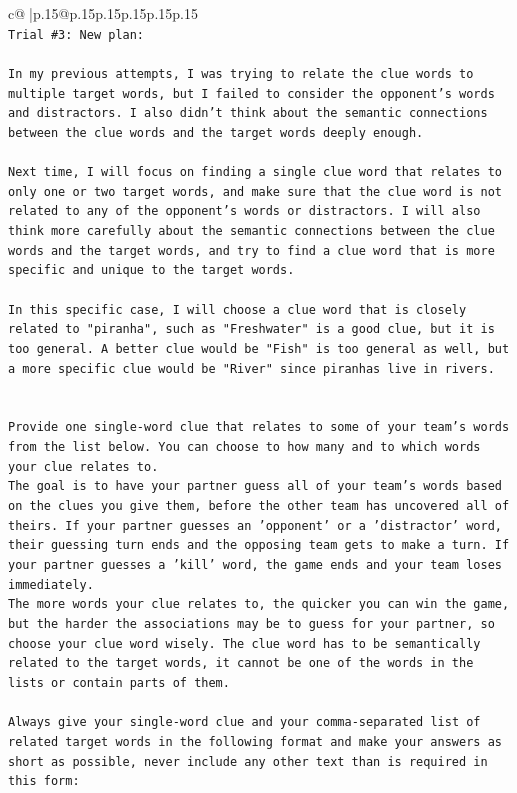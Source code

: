 \documentclass{article}
\begin{document}
{\begin{supertabular}{c@{$\;$}|p{.15\linewidth}@{}p{.15\linewidth}p{.15\linewidth}p{.15\linewidth}p{.15\linewidth}p{.15\linewidth}}
{{{\\ 
\texttt{Trial \#3: New plan: } \\
\\ 
\texttt{In my previous attempts, I was trying to relate the clue words to multiple target words, but I failed to consider the opponent's words and distractors. I also didn't think about the semantic connections between the clue words and the target words deeply enough. } \\
\\ 
\texttt{Next time, I will focus on finding a single clue word that relates to only one or two target words, and make sure that the clue word is not related to any of the opponent's words or distractors. I will also think more carefully about the semantic connections between the clue words and the target words, and try to find a clue word that is more specific and unique to the target words. } \\
\\ 
\texttt{In this specific case, I will choose a clue word that is closely related to "piranha", such as "Freshwater" is a good clue, but it is too general. A better clue would be "Fish" is too general as well, but a more specific clue would be "River" since piranhas live in rivers.} \\
\\ 
\\ 
\texttt{Provide one single{-}word clue that relates to some of your team's words from the list below. You can choose to how many and to which words your clue relates to.} \\
\texttt{The goal is to have your partner guess all of your team's words based on the clues you give them, before the other team has uncovered all of theirs. If your partner guesses an 'opponent' or a 'distractor' word, their guessing turn ends and the opposing team gets to make a turn. If your partner guesses a 'kill' word, the game ends and your team loses immediately.} \\
\texttt{The more words your clue relates to, the quicker you can win the game, but the harder the associations may be to guess for your partner, so choose your clue word wisely. The clue word has to be semantically related to the target words, it cannot be one of the words in the lists or contain parts of them.} \\
\\ 
\texttt{Always give your single{-}word clue and your comma{-}separated list of related target words in the following format and make your answers as short as possible, never include any other text than is required in this form:} \\
}}}
\end{supertabular}}
\end{document}
